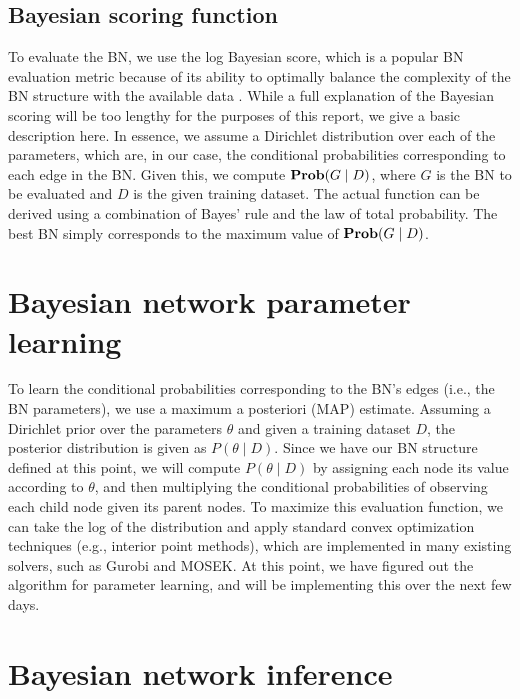 \documentclass[11pt]{article}
\begin{document}
\subsection{Bayesian scoring function}

To evaluate the BN, we use the log Bayesian score, which is a popular BN evaluation metric because of its ability to optimally balance the complexity of the BN structure with the available data \cite{KF:09}. While a full explanation of the Bayesian scoring will be too lengthy for the purposes of this report, we give a basic description here. In essence, we assume a Dirichlet distribution over each of the parameters, which are, in our case, the conditional probabilities corresponding to each edge in the BN. Given this, we compute $\mathop{\bf Prob}(G\mid D)$, where $G$ is the BN to be evaluated and $D$ is the given training dataset. The actual function can be derived using a combination of Bayes' rule and the law of total probability. The best BN simply corresponds to the maximum value of $\mathop{\bf Prob}(G\mid D)$.

\section{Bayesian network parameter learning}

To learn the conditional probabilities corresponding to the BN’s edges (i.e., the BN parameters), we use a maximum a posteriori (MAP) estimate. Assuming a Dirichlet prior over the parameters $\theta$ and given a training dataset $D$, the posterior distribution is given as $P(\theta \mid D)$. Since we have our BN structure defined at this point, we will compute $P(\theta \mid D)$ by assigning each node its value according to $\theta$, and then multiplying the conditional probabilities of observing each child node given its parent nodes. To maximize this evaluation function, we can take the log of the distribution and apply standard convex optimization techniques (e.g., interior point methods), which are implemented in many existing solvers, such as Gurobi and MOSEK. At this point, we have figured out the algorithm for parameter learning, and will be implementing this over the next few days.

\section{Bayesian network inference}
\end{document}
